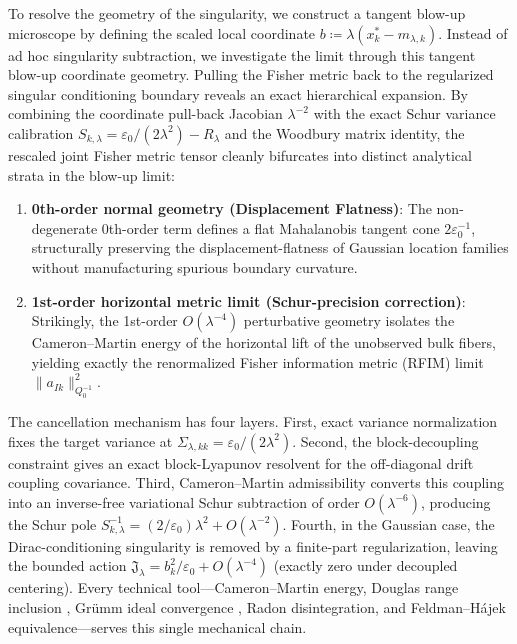\documentclass[11pt]{amsart}
\theoremstyle{plain}
\theoremstyle{definition}
\theoremstyle{remark}
\begin{document}
    To resolve the geometry of the singularity, we construct a tangent blow-up microscope by defining the scaled local coordinate $b \coloneqq \lambda(x_k^* - m_{\lambda,k})$. Instead of ad hoc singularity subtraction, we investigate the limit through this tangent blow-up coordinate geometry. Pulling the Fisher metric back to the regularized singular conditioning boundary reveals an exact hierarchical expansion. By combining the coordinate pull-back Jacobian $\lambda^{-2}$ with the exact Schur variance calibration $S_{k,\lambda} = \varepsilon_0/(2\lambda^2) - R_\lambda$ and the Woodbury matrix identity, the rescaled joint Fisher metric tensor cleanly bifurcates into distinct analytical strata in the blow-up limit:
    \begin{enumerate}
        \item \textbf{0th-order normal geometry (Displacement Flatness)}: The non-degenerate 0th-order term defines a flat Mahalanobis tangent cone $2\varepsilon_0^{-1}$, structurally preserving the displacement-flatness of Gaussian location families without manufacturing spurious boundary curvature.
        \item \textbf{1st-order horizontal metric limit (Schur-precision correction)}: Strikingly, the 1st-order $O(\lambda^{-4})$ perturbative geometry isolates the Cameron--Martin energy of the horizontal lift of the unobserved bulk fibers, yielding exactly the renormalized Fisher information metric (RFIM) limit $\|a_{Ik}\|_{Q_0^{-1}}^2$.
    \end{enumerate}

    The cancellation mechanism has four layers. First, exact variance normalization fixes the target variance at $\Sigma_{\lambda,kk}=\varepsilon_0/(2\lambda^2)$. Second, the block-decoupling constraint gives an exact block-Lyapunov resolvent for the off-diagonal drift coupling covariance. Third, Cameron--Martin admissibility converts this coupling into an inverse-free variational Schur subtraction of order $O(\lambda^{-6})$, producing the Schur pole $S_{k,\lambda}^{-1}=(2/\varepsilon_0)\lambda^2+O(\lambda^{-2})$. Fourth, in the Gaussian case, the Dirac-conditioning singularity is removed by a finite-part regularization, leaving the bounded action $\mathfrak{J}_\lambda=b_k^2/\varepsilon_0+O(\lambda^{-4})$ (exactly zero under decoupled centering). Every technical tool---Cameron--Martin energy, Douglas range inclusion \cite{douglas1966majorization}, Gr\"umm ideal convergence \cite{simon2005trace}, Radon disintegration, and Feldman--H\'{a}jek equivalence---serves this single mechanical chain.
\end{document}
